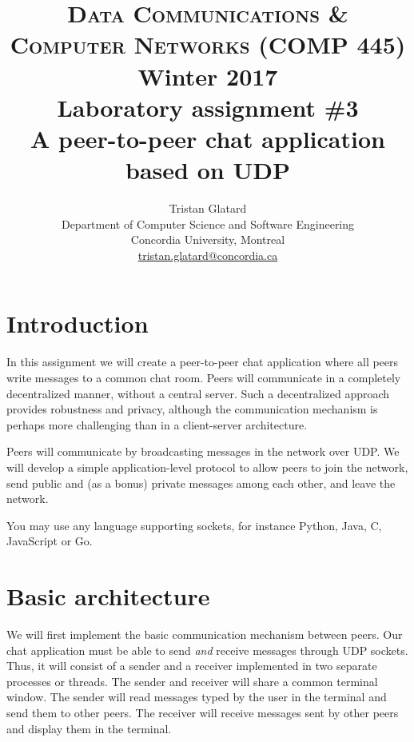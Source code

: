 \documentclass[11pt]{article}
\title{\textsc{Data Communications \& Computer Networks (COMP 445)} \\ Winter 2017 \\ Laboratory assignment \#3 \\ A peer-to-peer chat application based on UDP}
\author{Tristan Glatard\\Department of Computer Science and Software Engineering\\Concordia University, Montreal\\\href{mailto:tristan.glatard@concordia.ca}{tristan.glatard@concordia.ca}}
\begin{document}
\maketitle

\newpage

\tableofcontents

\newpage

\section{Introduction}

In this assignment we will create a peer-to-peer chat application
where all peers write messages to a common chat room. Peers will
communicate in a completely decentralized manner, without a central
server. Such a decentralized approach provides robustness and privacy,
although the communication mechanism is perhaps more challenging than in a
client-server architecture.

Peers will communicate by broadcasting messages
in the network over UDP. We will develop a simple application-level
protocol to allow peers to join the network, send public and (as a
bonus) private messages among each other, and leave the network.

You may use any language supporting sockets, for instance
Python, Java, C, JavaScript or Go. 

\section{Basic architecture}
\label{sec:architecture}

We will first implement the basic communication mechanism between
peers. Our chat application must be able to send \emph{and} receive
messages through UDP sockets. Thus, it will consist of a
sender and a receiver implemented in two separate processes or
threads. The sender and receiver will share a common terminal
window. The sender will read messages typed by the user in the
terminal and send them to other peers. The receiver will receive
messages sent by other peers and display them in the terminal. 
\end{document}
